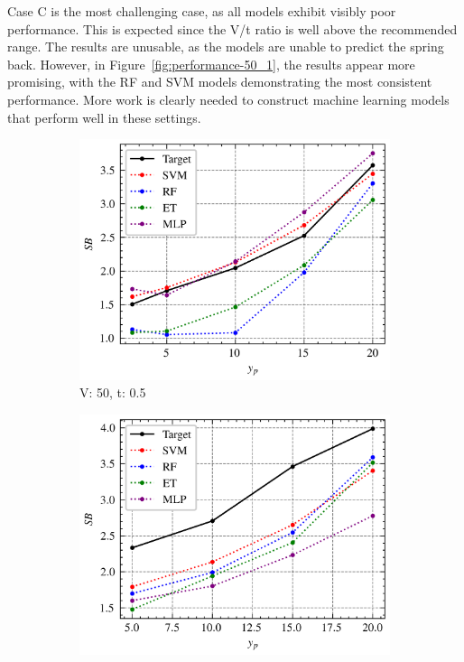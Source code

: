 Case C is the most challenging case, as all models exhibit visibly poor performance. This is expected since the V/t
ratio is well above the recommended range.
The results are unusable, as the models are unable to predict the spring
back.
However, in Figure~\ref{fig:performance-50_1}, the results appear more promising, with the RF and SVM models
demonstrating the most consistent performance.
More work is clearly needed to construct machine learning models that perform well in these settings.

\begin{figure}[h]
    \begin{tcolorbox}[arc=0pt,boxrule=0.5pt]
        \begin{subfigure}{0.5\textwidth}
            \includegraphics[width=\textwidth]{chap5/images/performance_40_0.5}
            \caption{V: 50, t: 0.5}
            \label{fig:performance-50_0.5}
        \end{subfigure}
        \hfill
        \begin{subfigure}{0.5\textwidth}
            \includegraphics[width=\textwidth]{chap5/images/performance_50_0.5}

\end{subfigure}
\end{tcolorbox}
\end{figure}
